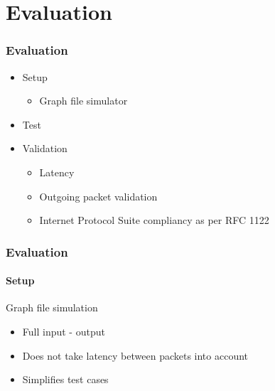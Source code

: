 \section{Evaluation}
\newcommand{\EvaluationTitle}{Evaluation}
\begin{frame}
    \frametitle{\EvaluationTitle}
    \centering
    \begin{minipage}{1\textwidth}
        \begin{itemize}%
            \item Setup
            \begin{itemize}
                \item Graph file simulator
            \end{itemize}
            \item Test
            \item Validation
            \begin{itemize}
                \item Latency
                \item Outgoing packet validation
                \item Internet Protocol Suite
                compliancy as per RFC
                1122
            \end{itemize}
        \end{itemize}
    \end{minipage}
\end{frame}

\begin{frame}[fragile]
    \frametitle{\EvaluationTitle}
    \framesubtitle{Setup}
    Graph file simulation\\
    \begin{itemize}%
        \item Full input - output
        \item Does not take latency between packets into account
        \item Simplifies test cases
    \end{itemize}
\end{frame}



